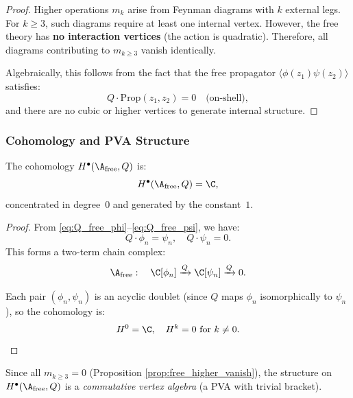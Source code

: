 \begin{proof}
Higher operations $m_k$ arise from Feynman diagrams with $k$ external legs. For $k \geq 3$, such diagrams require at least one internal vertex. However, the free theory has \textbf{no interaction vertices} (the action is quadratic). Therefore, all diagrams contributing to $m_{k \geq 3}$ vanish identically.

Algebraically, this follows from the fact that the free propagator $\langle \phi(z_1)\psi(z_2)\rangle$ satisfies:
\begin{equation}
Q \cdot \text{Prop}(z_1, z_2) = 0 \quad \text{(on-shell)},
\end{equation}
and there are no cubic or higher vertices to generate internal structure.
\end{proof}

\subsubsection{Cohomology and PVA Structure}

\begin{proposition}
The cohomology $H^\bullet(\A_{\text{free}}, Q)$ is:
\begin{equation}
H^\bullet(\A_{\text{free}}, Q) = \C,
\end{equation}
concentrated in degree~$0$ and generated by the constant~$1$.
\end{proposition}

\begin{proof}
From \eqref{eq:Q_free_phi}--\eqref{eq:Q_free_psi}, we have:
\begin{equation}
Q \cdot \phi_n = \psi_n, \quad Q \cdot \psi_n = 0.
\end{equation}
This forms a two-term chain complex:
\begin{equation}
\A_{\text{free}} : \quad \C[\phi_n] \xrightarrow{Q} \C[\psi_n] \xrightarrow{Q} 0.
\end{equation}

Each pair $(\phi_n, \psi_n)$ is an acyclic doublet (since $Q$ maps $\phi_n$ isomorphically to $\psi_n$), so the cohomology is:
\begin{equation}
H^0 = \C, \quad H^{k} = 0 \text{ for } k \neq 0.
\end{equation}
\end{proof}
Since all $m_{k \geq 3} = 0$ (Proposition \ref{prop:free_higher_vanish}), the structure on $H^\bullet(\A_{\text{free}}, Q)$ is a \emph{commutative vertex algebra} (a PVA with trivial bracket).

